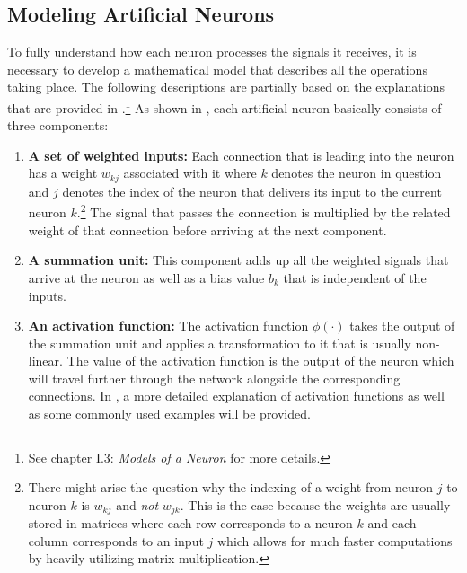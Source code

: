 \subsection{Modeling Artificial Neurons}
\label{sec:artificial-neurons}
To fully understand how each neuron processes the signals it receives,
it is necessary to develop a mathematical model that describes all the
operations taking place. The following descriptions are partially
based on the explanations that are provided in \cite{Haykin}.\footnote{See
  chapter I.3: \textit{Models of a Neuron} for more details.}
As shown in , each artificial neuron
basically consists of three components:
\begin{enumerate}
  \item \textbf{A set of weighted inputs:} Each connection that is
    leading into the neuron has a weight \(w_{kj}\) associated with it
    where \(k\) denotes the neuron in question and \(j\) denotes the
    index of the neuron that delivers its input to the current neuron
    \(k\).\footnote{There might arise the question why the indexing of
    a weight from neuron \(j\) to neuron \(k\) is \(w_{kj}\) and
    \textit{not} \(w_{jk}\). This is the case because the weights are
    usually stored in matrices where each row corresponds to a
    neuron \(k\) and each column corresponds to an input \(j\) which
    allows for much faster computations by heavily utilizing
    matrix-multiplication.} The signal that
    passes the connection is multiplied by the
    related weight of that connection before arriving at the next
    component.
  \item \textbf{A summation unit:} This component adds up all the
    weighted signals that arrive at the neuron as well as a bias value
    \(b_k\) that is independent of the inputs.
  \item \textbf{An activation function:} The activation function
    \(\phi(\cdot)\) takes the output of the summation unit and applies
    a transformation to it that is usually non-linear. The value of
    the activation function is the output of the neuron which will
    travel further through the network alongside the corresponding
    connections. In , a more
    detailed explanation of activation functions as well as some
    commonly used examples will be provided.
\end{enumerate}
